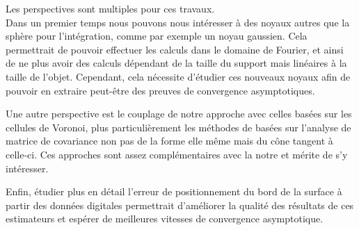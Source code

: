 Les perspectives sont multiples pour ces travaux.\\
%
Dans un premier temps nous pouvons nous intéresser à des noyaux autres que la
sphère pour l'intégration, comme par exemple un noyau gaussien. Cela permettrait
de pouvoir effectuer les calculs dans le domaine de Fourier, et ainsi de ne plus
avoir des calculs dépendant de la taille du support mais linéaires à la taille de
l'objet. Cependant, cela nécessite d'étudier ces nouveaux noyaux afin de pouvoir
en extraire peut-être des preuves de convergence asymptotiques.


Une autre perspective est le couplage de notre approche avec celles basées sur
les cellules de Voronoi, plus particulièrement les méthodes de \VCMM
\cite{Merigot2009,Merigot2011,Cuel2014} basées sur l'analyse de matrice de
covariance non pas de la forme elle même mais du cône tangent à celle-ci. Ces
approches sont assez complémentaires avec la notre et mérite de s'y intéresser.


Enfin, étudier plus en détail l'erreur de positionnement du bord de la surface à
partir des données digitales permettrait d'améliorer la qualité des résultats de
ces estimateurs et espérer de meilleures vitesses de convergence asymptotique.
